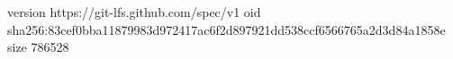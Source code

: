 version https://git-lfs.github.com/spec/v1
oid sha256:83cef0bba11879983d972417ac6f2d897921dd538ccf6566765a2d3d84a1858e
size 786528
